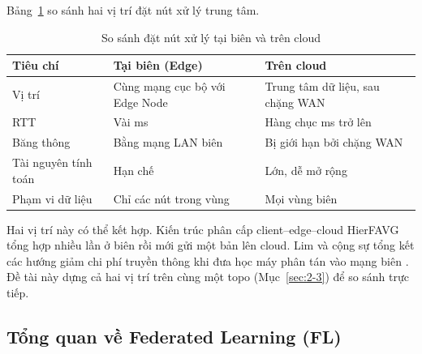 Bảng~\ref{tab:edgecloud} so sánh hai vị trí đặt nút xử lý trung tâm.

\begin{table}[H]
    \centering
    \caption{So sánh đặt nút xử lý tại biên và trên cloud}
    \label{tab:edgecloud}
    \begin{tabularx}{\textwidth}{>{\raggedright\arraybackslash\hsize=0.6\hsize}X >{\raggedright\arraybackslash\hsize=1.2\hsize}X >{\raggedright\arraybackslash\hsize=1.2\hsize}X}
        \toprule
        \textbf{Tiêu chí} & \textbf{Tại biên (Edge)} & \textbf{Trên cloud} \\
        \midrule
        Vị trí & Cùng mạng cục bộ với Edge Node & Trung tâm dữ liệu, sau chặng WAN \\
        \midrule
        RTT & Vài ms & Hàng chục ms trở lên \\
        \midrule
        Băng thông & Bằng mạng LAN biên & Bị giới hạn bởi chặng WAN \\
        \midrule
        Tài nguyên tính toán & Hạn chế & Lớn, dễ mở rộng \\
        \midrule
        Phạm vi dữ liệu & Chỉ các nút trong vùng & Mọi vùng biên \\
        \bottomrule
    \end{tabularx}
\end{table}

Hai vị trí này có thể kết hợp. Kiến trúc phân cấp client--edge--cloud HierFAVG \cite{liu2020hierfavg} tổng hợp nhiều lần ở biên rồi mới gửi một bản lên cloud. Lim và cộng sự tổng kết các hướng giảm chi phí truyền thông khi đưa học máy phân tán vào mạng biên \cite{lim2020survey}. Đề tài này dựng cả hai vị trí trên cùng một topo (Mục~\ref{sec:2-3}) để so sánh trực tiếp.

\subsection{Tổng quan về Federated Learning (FL)}
\label{sec:1-2}

